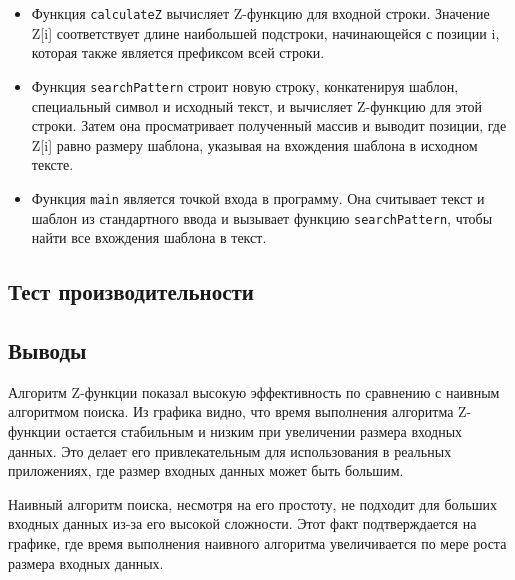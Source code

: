 \documentclass[12pt]{article}
\begin{document}
\begin{itemize}
\item Функция \texttt{calculateZ} вычисляет Z-функцию для входной строки. Значение Z[i] соответствует длине наибольшей подстроки, начинающейся с позиции i, которая также является префиксом всей строки.

\item Функция \texttt{searchPattern} строит новую строку, конкатенируя шаблон, специальный символ и исходный текст, и вычисляет Z-функцию для этой строки. Затем она просматривает полученный массив и выводит позиции, где Z[i] равно размеру шаблона, указывая на вхождения шаблона в исходном тексте.

\item Функция \texttt{main} является точкой входа в программу. Она считывает текст и шаблон из стандартного ввода и вызывает функцию \texttt{searchPattern}, чтобы найти все вхождения шаблона в текст.
\end{itemize}


\subsection*{Тест производительности}



\subsection*{Выводы}

Алгоритм Z-функции показал высокую эффективность по сравнению с наивным алгоритмом поиска. Из графика видно, что время выполнения алгоритма Z-функции остается стабильным и низким при увеличении размера входных данных. Это делает его привлекательным для использования в реальных приложениях, где размер входных данных может быть большим.

Наивный алгоритм поиска, несмотря на его простоту, не подходит для больших входных данных из-за его высокой сложности. Этот факт подтверждается на графике, где время выполнения наивного алгоритма увеличивается по мере роста размера входных данных.
\end{document}
